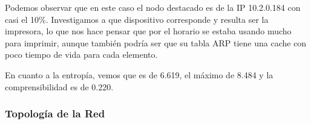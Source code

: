 \begin{figure}[hp!]
	\begin{minipage}[b]{0.9\linewidth}
	\end{minipage}
\end{figure}

Podemos observar que en este caso el nodo destacado es de la IP 10.2.0.184 con casi el 10\%.
Investigamos a que dispositivo corresponde y resulta ser la impresora, lo que nos hace pensar que
por el horario se estaba usando mucho para imprimir, aunque también podría ser
que su tabla ARP tiene una cache con poco tiempo de vida para cada elemento.

En cuanto a la entropía, vemos que es de 6.619, el máximo de 8.484 y la comprensibilidad es
de 0.220.

\subsubsection{Topolog\'ia de la Red}

